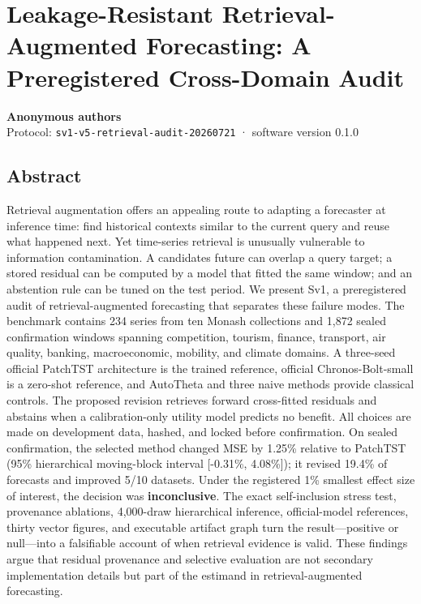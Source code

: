 \documentclass[
]{article}
\author{}
\date{}
\begin{document}
\section{Leakage-Resistant Retrieval-Augmented Forecasting: A
Preregistered Cross-Domain
Audit}\label{leakage-resistant-retrieval-augmented-forecasting-a-preregistered-cross-domain-audit}

\textbf{Anonymous authors}\\
Protocol: \texttt{sv1-v5-retrieval-audit-20260721} · software version
0.1.0

\subsection{Abstract}\label{abstract}

Retrieval augmentation offers an appealing route to adapting a
forecaster at inference time: find historical contexts similar to the
current query and reuse what happened next. Yet time-series retrieval is
unusually vulnerable to information contamination. A
candidate\textquotesingle s future can overlap a query target; a stored
residual can be computed by a model that fitted the same window; and an
abstention rule can be tuned on the test period. We present Sv1, a
preregistered audit of retrieval-augmented forecasting that separates
these failure modes. The benchmark contains 234 series from ten Monash
collections and 1,872 sealed confirmation windows spanning competition,
tourism, finance, transport, air quality, banking, macroeconomic,
mobility, and climate domains. A three-seed official PatchTST
architecture is the trained reference, official Chronos-Bolt-small is a
zero-shot reference, and AutoTheta and three naive methods provide
classical controls. The proposed revision retrieves forward cross-fitted
residuals and abstains when a calibration-only utility model predicts no
benefit. All choices are made on development data, hashed, and locked
before confirmation. On sealed confirmation, the selected method changed
MSE by 1.25\% relative to PatchTST (95\% hierarchical moving-block
interval {[}-0.31\%, 4.08\%{]}); it revised 19.4\% of forecasts and
improved 5/10 datasets. Under the registered 1\% smallest effect size of
interest, the decision was \textbf{inconclusive}. The exact
self-inclusion stress test, provenance ablations, 4,000-draw
hierarchical inference, official-model references, thirty vector
figures, and executable artifact graph turn the result---positive or
null---into a falsifiable account of when retrieval evidence is valid.
These findings argue that residual provenance and selective evaluation
are not secondary implementation details but part of the estimand in
retrieval-augmented forecasting.
\end{document}
